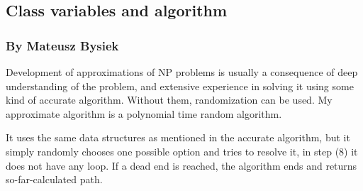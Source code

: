 \documentclass{article}
\begin{document}
\subsection{Class variables and algorithm}
\subsubsection{By Mateusz Bysiek}
Development of approximations of NP problems is usually a consequence 
of deep understanding of the problem, and extensive experience in solving it using
some kind of accurate algorithm. Without them, randomization can be used.
My approximate algorithm is a polynomial time random algorithm.

It uses the same data structures as mentioned in the accurate algorithm, but it simply randomly
chooses one possible option and tries to resolve it, in step (8) it does not have any loop.
If a dead end is reached, the algorithm ends and returns so-far-calculated path.
\end{document}
